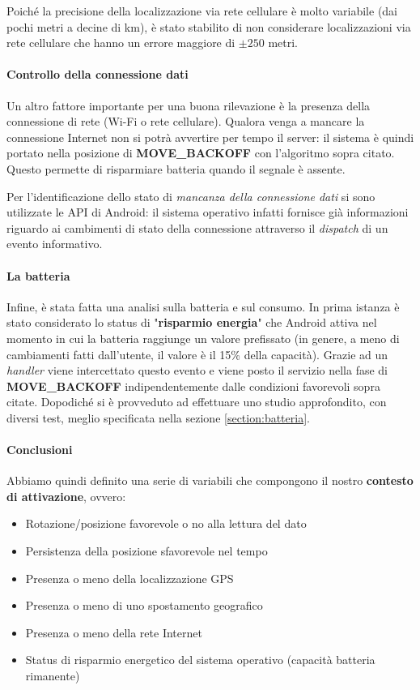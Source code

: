 \documentclass[a4paper,10pt]{memoir}
\begin{document}
Poiché la precisione della localizzazione via rete cellulare è molto variabile (dai pochi metri a decine di km), è stato stabilito di non considerare localizzazioni via rete cellulare che hanno un errore maggiore di $\pm250$ metri.

\paragraph{Controllo della connessione dati} Un altro fattore importante per una buona rilevazione è la presenza della connessione di rete (Wi-Fi o rete cellulare). Qualora venga a mancare la connessione Internet non si potrà avvertire per tempo il server: il sistema è quindi portato nella posizione di \textbf{MOVE\_BACKOFF} con l'algoritmo sopra citato. Questo permette di risparmiare batteria quando il segnale è assente.

Per l'identificazione dello stato di \textit{mancanza della connessione dati} si sono utilizzate le API di Android: il sistema operativo infatti fornisce già informazioni riguardo ai cambimenti di stato della connessione attraverso il \textit{dispatch} di un evento informativo.

\paragraph{La batteria} Infine, è stata fatta una analisi sulla batteria e sul consumo. In prima istanza è stato considerato lo status di "\textbf{risparmio energia}" che Android attiva nel momento in cui la batteria raggiunge un valore prefissato (in genere, a meno di cambiamenti fatti dall'utente, il valore è il 15\% della capacità). Grazie ad un \textit{handler} viene intercettato questo evento e viene posto il servizio nella fase di \textbf{MOVE\_BACKOFF} indipendentemente dalle condizioni favorevoli sopra citate. Dopodiché si è provveduto ad effettuare uno studio approfondito, con diversi test, meglio specificata nella sezione \ref{section:batteria}.

\paragraph{Conclusioni} Abbiamo quindi definito una serie di variabili che compongono il nostro \textbf{contesto di attivazione}, ovvero:

\begin{itemize}
\item Rotazione/posizione favorevole o no alla lettura del dato
\item Persistenza della posizione sfavorevole nel tempo
\item Presenza o meno della localizzazione GPS
\item Presenza o meno di uno spostamento geografico
\item Presenza o meno della rete Internet
\item Status di risparmio energetico del sistema operativo (capacità batteria rimanente)
\end{itemize}
\end{document}
